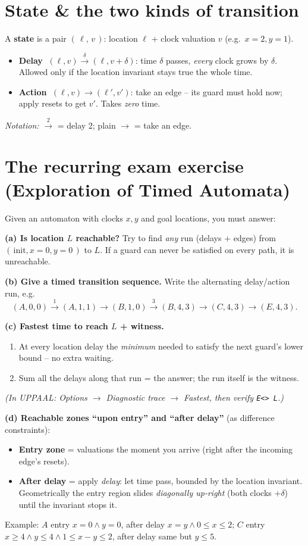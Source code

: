 \section{State \& the two kinds of transition}
A \textbf{state} is a pair $(\,\ell,\,v\,)$: location $\ell$ + clock valuation $v$ (e.g.\ $x{=}2,y{=}1$).
\begin{itemize}
\item \textbf{Delay} $\;(\ell,v)\xrightarrow{\;\delta\;}(\ell,v{+}\delta)$: time $\delta$ passes, \emph{every} clock grows by $\delta$. Allowed only if the location invariant stays true the whole time.
\item \textbf{Action} $\;(\ell,v)\to(\ell',v')$: take an edge -- its guard must hold now; apply resets to get $v'$. Takes \emph{zero} time.
\end{itemize}
\textit{Notation:} $\xrightarrow{\,2\,}$ = delay 2; plain $\to$ = take an edge.

\section{The recurring exam exercise (Exploration of Timed Automata)}
Given an automaton with clocks $x,y$ and goal locations, you must answer:

\textbf{(a) Is location $L$ reachable?} Try to find \emph{any} run (delays + edges) from
$(\,\text{init},x{=}0,y{=}0\,)$ to $L$. If a guard can never be satisfied on every path, it is unreachable.

\textbf{(b) Give a timed transition sequence.} Write the alternating delay/action run, e.g.
\[
(A,0,0)\xrightarrow{1}(A,1,1)\to(B,1,0)\xrightarrow{3}(B,4,3)\to(C,4,3)\to(E,4,3).
\]

\textbf{(c) Fastest time to reach $L$ + witness.}
\begin{enumerate}
\item At every location delay the \emph{minimum} needed to satisfy the next guard's lower bound -- no extra waiting.
\item Sum all the delays along that run = the answer; the run itself is the witness.
\end{enumerate}
\textit{(In UPPAAL: Options $\to$ Diagnostic trace $\to$ Fastest, then verify \texttt{E<> L}.)}

\textbf{(d) Reachable zones ``upon entry'' and ``after delay''} (as difference constraints):
\begin{itemize}
\item \textbf{Entry zone} = valuations the moment you arrive (right after the incoming edge's resets).
\item \textbf{After delay} = apply \emph{delay}: let time pass, bounded by the location invariant. Geometrically the entry region slides \emph{diagonally up-right} (both clocks $+\delta$) until the invariant stops it.
\end{itemize}
Example: $A$ entry $x{=}0\wedge y{=}0$, after delay $x{=}y\wedge 0\le x\le2$;\;
$C$ entry $x\ge4\wedge y\le4\wedge1\le x{-}y\le2$, after delay same but $y\le5$.

